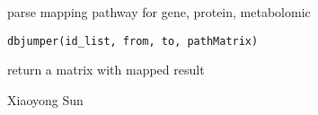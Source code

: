 \begin{Description}\relax
parse mapping pathway for gene, protein, metabolomic
\end{Description}
\begin{Usage}
\begin{verbatim}
dbjumper(id_list, from, to, pathMatrix)
\end{verbatim}
\end{Usage}
\begin{Arguments}
\begin{ldescription}
\item[\code{id\_list}] 
\item[\code{from}] 
\item[\code{to}] 
\item[\code{pathMatrix}] 
\end{ldescription}
\end{Arguments}
\begin{Value}
return a matrix with mapped result
\end{Value}
\begin{Author}\relax
Xiaoyong Sun
\end{Author}

